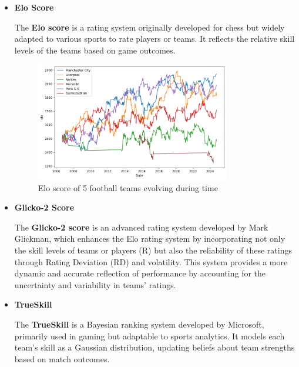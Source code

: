 \begin{itemize}

\item \textbf{Elo Score}
\label{par:elo_score}

The \textbf{Elo score} \cite{Elo1978} \cite{HvattumArntzen2010} is a rating system originally developed for chess but widely adapted to various sports to rate players or teams. It reflects the relative skill levels of the teams based on game outcomes.

\begin{figure}[H]
    \centering
    \includegraphics[width=0.8\textwidth, keepaspectratio]{images/elo_score_5_teams_during_time.png}
    \caption{Elo score of 5 football teams evolving during time}
    \label{fig:elo_score_5_teams_during_time}
\end{figure}



\item \textbf{Glicko-2 Score}
\label{par:glicko2_score}

The \textbf{Glicko-2 score} \cite{Glickman1999} is an advanced rating system developed by Mark Glickman, which enhances the Elo rating system by incorporating not only the skill levels of teams or players (R) but also the reliability of these ratings through Rating Deviation (RD) and volatility. This system provides a more dynamic and accurate reflection of performance by accounting for the uncertainty and variability in teams' ratings.


\item \textbf{TrueSkill}
\label{par:trueskill}

The \textbf{TrueSkill} \cite{HerbrichEtAl2007} is a Bayesian ranking system developed by Microsoft, primarily used in gaming but adaptable to sports analytics. It models each team's skill as a Gaussian distribution, updating beliefs about team strengths based on match outcomes.

\end{itemize}

